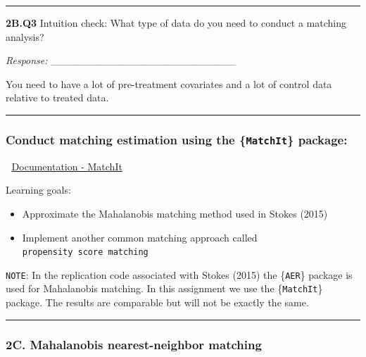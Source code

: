 \documentclass[
  letterpaper,
  DIV=11,
  numbers=noendperiod]{scrartcl}
\providecommand{\tightlist}{%
  \setlength{\itemsep}{0pt}\setlength{\parskip}{0pt}}
\begin{document}
\begin{center}\rule{0.5\linewidth}{0.5pt}\end{center}

\textbf{2B.Q3} Intuition check: What type of data do you need to conduct
a matching analysis?

\emph{Response:} \_\_\_\_\_\_\_\_\_\_\_\_\_\_\_\_\_\_\_\_\_\_\_\_\_

You need to have a lot of pre-treatment covariates and a lot of control
data relative to treated data.

\begin{center}\rule{0.5\linewidth}{0.5pt}\end{center}

\subsubsection{\texorpdfstring{Conduct matching estimation using the
\{\texttt{MatchIt}\}
package:}{Conduct matching estimation using the \{MatchIt\} package:}}\label{conduct-matching-estimation-using-the-matchit-package}

📜 \href{https://kosukeimai.github.io/MatchIt/}{Documentation - MatchIt}

Learning goals:

\begin{itemize}
\tightlist
\item
  Approximate the Mahalanobis matching method used in Stokes (2015)
\item
  Implement another common matching approach called
  \texttt{propensity\ score\ matching}
\end{itemize}

\begin{tcolorbox}[enhanced jigsaw, colback=white, breakable, rightrule=.15mm, leftrule=.75mm, colframe=quarto-callout-color-frame, opacityback=0, arc=.35mm, bottomrule=.15mm, toprule=.15mm, left=2mm]

\texttt{NOTE}: In the replication code associated with Stokes (2015) the
\{\texttt{AER}\} package is used for Mahalanobis matching. In this
assignment we use the \{\texttt{MatchIt}\} package. The results are
comparable but will not be exactly the same.

\end{tcolorbox}

\begin{center}\rule{0.5\linewidth}{0.5pt}\end{center}

\subsubsection{2C. Mahalanobis nearest-neighbor
matching}\label{c.-mahalanobis-nearest-neighbor-matching}
\end{document}
